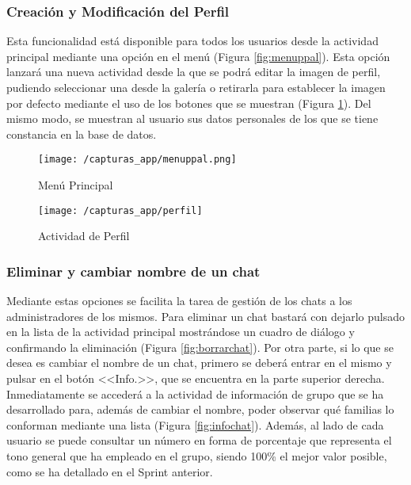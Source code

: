 \subsubsection{Creación y Modificación del Perfil}
Esta funcionalidad está disponible para todos los usuarios desde la actividad principal mediante una opción en el menú (Figura \ref{fig:menuppal}). Esta opción lanzará una nueva actividad desde la que se podrá editar la imagen de perfil, pudiendo seleccionar una desde la galería o retirarla para establecer la imagen por defecto mediante el uso de los botones que se muestran (Figura \ref{fig:perfil}). Del mismo modo, se muestran al usuario sus datos personales de los que se tiene constancia en la base de datos.

\begin{figure}[!h]
	\centering
	\begin{minipage}{.5\textwidth}
		\centering
		\texttt{[image: /capturas\_app/menuppal.png]}
		\caption{Menú Principal}
		\label{fig:menuppal}
	\end{minipage}%
	\begin{minipage}{.5\textwidth}
		\centering
		\texttt{[image: /capturas\_app/perfil]}
		\caption{Actividad de Perfil}
		\label{fig:perfil}
	\end{minipage}
\end{figure}

\clearpage

\subsubsection{Eliminar y cambiar nombre de un chat}
Mediante estas opciones se facilita la tarea de gestión de los chats a los administradores de los mismos. Para eliminar un chat bastará con dejarlo pulsado en la lista de la actividad principal mostrándose un cuadro de diálogo y confirmando la eliminación (Figura \ref{fig:borrarchat}). Por otra parte, si lo que se desea es cambiar el nombre de un chat, primero se deberá entrar en el mismo y pulsar en el botón <<Info.>>, que se encuentra en la parte superior derecha. Inmediatamente se accederá a la actividad de información de grupo que se ha desarrollado para, además de cambiar el nombre, poder observar qué familias lo conforman mediante una lista (Figura \ref{fig:infochat}). Además, al lado de cada usuario se puede consultar un número en forma de porcentaje que representa el tono general que ha empleado en el grupo, siendo 100\% el mejor valor posible, como se ha detallado en el Sprint anterior.

